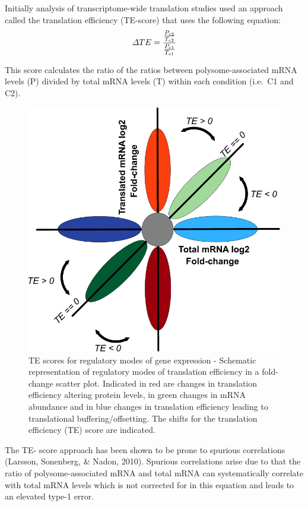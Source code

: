 \documentclass[
  12pt,
  openany]{book}
\begin{document}
Initially analysis of transcriptome-wide translation studies used an approach called the translation efficiency (TE-score) that uses the following equation:
\[\varDelta TE = \frac{\frac{P_{c2}}{T_{c2}}} {\frac{P_{c1}}{T_{c1}}}\\\]

This score calculates the ratio of the ratios between polysome-associated mRNA levels (P) divided by total mRNA levels (T) within each condition (i.e.~C1 and C2).

\begin{figure}
  \includegraphics{./figures/geneModes_TE.pdf}
  \caption{TE scores for regulatory modes of gene expression -  Schematic representation of regulatory modes of translation efficiency in a fold-change scatter plot. Indicated in red are changes in translation efficiency altering protein levels, in green changes in mRNA abundance and in blue changes in translation efficiency leading to translational buffering/offsetting. The shifts for the translation efficiency (TE) score are indicated. \label{fig:TE}}
\end{figure}

The TE- score approach has been shown to be prone to spurious correlations (Larsson, Sonenberg, \& Nadon, 2010). Spurious correlations arise due to that the ratio of polysome-associated mRNA and total mRNA can systematically correlate with total mRNA levels which is not corrected for in this equation and leads to an elevated type-1 error.
\end{document}
